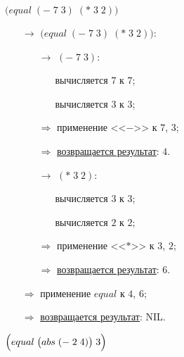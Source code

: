 \problem $\bigl(equal\; (-\; 7\; 3)\; (*\; 3\; 2) \bigr)$

\begin{itemize}
	\item[$\longrightarrow$] $\bigl(equal\; (-\; 7\; 3)\; (*\; 3\; 2) \bigr)$:
	\begin{itemize}
		\item[$\longrightarrow$] $(-\; 7\; 3)$:
		\begin{itemize}
			\item[\textbullet] вычисляется $7$ к $7$;
			\item[\textbullet] вычисляется $3$ к $3$;
		\end{itemize}
		\item[$\Longrightarrow$] применение <<$-$>> к $7$, $3$;
		\item[$\Longrightarrow$] \underline{возвращается результат}: $4$.
		\item[$\longrightarrow$] $(*\; 3\; 2)$:
		\begin{itemize}
			\item[\textbullet] вычисляется $3$ к $3$;
			\item[\textbullet] вычисляется $2$ к $2$;
		\end{itemize}
		\item[$\Longrightarrow$] применение <<$*$>> к $3$, $2$;
		\item[$\Longrightarrow$] \underline{возвращается результат}: $6$.
	\end{itemize}
	\item[$\Longrightarrow$] применение $equal$ к $4$, $6$;
	\item[$\Longrightarrow$] \underline{возвращается результат}: NIL.
\end{itemize}
\vfill

\newpage
\problem $\Bigl(equal\; \bigl(abs\; (-\; 2\; 4)\bigr)\; 3\Bigr)$

